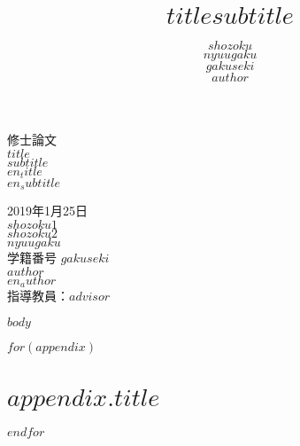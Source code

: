 \documentclass[a4paper,10.5pt]{jsreport}
\title{ \Large $title$\newline{\ddash}$subtitle${\ddash}}
\author{$shozoku$\\$nyuugaku$\\$gakuseki$\\$author$}
\date{}
\begin{document}
\begin{titlepage}

\begin{center}
\vspace*{100truept}
{\Large 修士論文}\\
\vspace{50truept}
{\huge $title$}\\ %
\vspace{10truept}
{\huge $subtitle$}\\ %
\vspace{10truept}
{\large $en_title$}\\ %
{\large $en_subtitle$}\\
\vspace{60truept}

{\Large 2019年1月25日}\\ %
\vspace{10truept}
{\Large $shozoku1$}\\
{\Large $shozoku2$}\\
\vspace{20truept}
{\Large $nyuugaku$}\\ %
\vspace{20truept}
{\Large 学籍番号 $gakuseki$}\\
\vspace{20truept}
{\Large $author$}\\ %
{\Large $en_author$}\\ %

\vspace{20truept}
{\large
指導教員：$advisor$\\
}
\end{center}

\end{titlepage}

\tableofcontents

$body$

\printbibliography[title = 参考文献]



\appendix

$for(appendix)$
\chapter{$appendix.title$}

$endfor$
\end{document}
